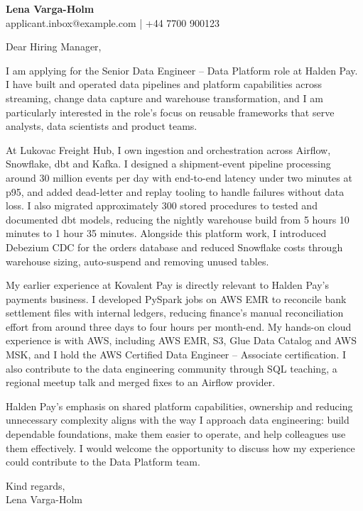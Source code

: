 \documentclass[11pt,a4paper]{article}
\begin{document}
{\Large\bfseries Lena Varga-Holm}\\
applicant.inbox@example.com | +44 7700 900123

Dear Hiring Manager,

I am applying for the Senior Data Engineer – Data Platform role at Halden Pay. I have built and operated data pipelines and platform capabilities across streaming, change data capture and warehouse transformation, and I am particularly interested in the role’s focus on reusable frameworks that serve analysts, data scientists and product teams.

At Lukovac Freight Hub, I own ingestion and orchestration across Airflow, Snowflake, dbt and Kafka. I designed a shipment-event pipeline processing around 30 million events per day with end-to-end latency under two minutes at p95, and added dead-letter and replay tooling to handle failures without data loss. I also migrated approximately 300 stored procedures to tested and documented dbt models, reducing the nightly warehouse build from 5 hours 10 minutes to 1 hour 35 minutes. Alongside this platform work, I introduced Debezium CDC for the orders database and reduced Snowflake costs through warehouse sizing, auto-suspend and removing unused tables.

My earlier experience at Kovalent Pay is directly relevant to Halden Pay’s payments business. I developed PySpark jobs on AWS EMR to reconcile bank settlement files with internal ledgers, reducing finance’s manual reconciliation effort from around three days to four hours per month-end. My hands-on cloud experience is with AWS, including AWS EMR, S3, Glue Data Catalog and AWS MSK, and I hold the AWS Certified Data Engineer – Associate certification. I also contribute to the data engineering community through SQL teaching, a regional meetup talk and merged fixes to an Airflow provider.

Halden Pay’s emphasis on shared platform capabilities, ownership and reducing unnecessary complexity aligns with the way I approach data engineering: build dependable foundations, make them easier to operate, and help colleagues use them effectively. I would welcome the opportunity to discuss how my experience could contribute to the Data Platform team.

Kind regards,\\
Lena Varga-Holm
\end{document}
